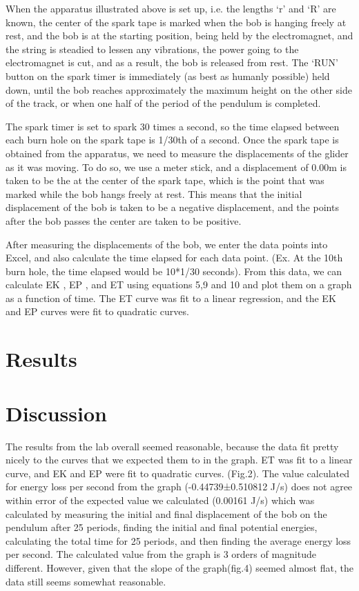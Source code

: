 \documentclass[letterpaper]{article}
\begin{document}
When the apparatus illustrated above is set up, i.e. the lengths ‘r’ and ‘R’ are known, the center of the spark tape is marked when the bob is hanging freely at rest, and the bob is at the starting position, being held by the electromagnet, and the string is steadied to lessen any vibrations, the power going to the electromagnet is cut, and as a result, the bob is released from rest. The ‘RUN’ button on the spark timer is immediately (as best as humanly possible) held down, until the bob reaches approximately the maximum height on the other side of the track, or when one half of the period of the pendulum is completed.

The spark timer is set to spark 30 times a second, so the time elapsed between each burn hole on the spark tape is 1/30th of a second. Once the spark tape is obtained from the apparatus, we need to measure the displacements of the glider as it was moving. To do so, we use a meter stick, and a displacement of 0.00m is taken to be the at the center of the spark tape, which is the point that was marked while the bob hangs freely at rest. This means that the initial displacement of the bob is taken to be a negative displacement, and the points after the bob passes the center are taken to be positive.

After measuring the displacements of the bob, we enter the data points into Excel, and also calculate the time elapsed for each data point. (Ex. At the 10th burn hole, the time elapsed would be 10*1/30 seconds). From this data, we can calculate EK , EP , and ET  using equations  5,9 and 10 and plot them on a graph as a function of time. The ET curve was fit to a linear regression, and the EK and EP curves were fit to quadratic curves.

\section{Results}
  \lipsum[3]

\section{Discussion}
The results from the lab overall seemed reasonable, because the data fit pretty nicely to the curves that we expected them to in the graph. ET was fit to a linear curve, and EK and EP were fit to quadratic curves.  (Fig.2).  The value calculated for energy loss per second from the graph (-0.44739±0.510812 J/s) does not agree within error of the expected value we calculated (0.00161 J/s) which was calculated by measuring the initial and final displacement of the bob on the pendulum after 25 periods, finding the initial and final potential energies, calculating the total time for 25 periods, and then finding the average energy loss per second. The calculated value from the graph is 3 orders of magnitude different. However, given that the slope of the graph(fig.4) seemed almost flat, the data still seems somewhat reasonable.
\end{document}
